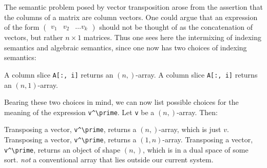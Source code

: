 The semantic problem posed by vector transposition arose from the assertion
that the columns of a matrix are column vectors. One could argue that an
expression of the form $\begin{pmatrix}v_1 & v_2 & \dots v_k \end{pmatrix}$
should not be thought of as the concatenation of vectors, but rather $n\times1$
matrices. Thus one sees here the intermixing of indexing semantics and
algebraic semantics, since one now has two choices of indexing semantics:

A column slice \lstinline|A[:, i]| returns an $(n,)$-array.\label{rule:col1}
A column slice \lstinline|A[:, i]| returns an $(n,1)$-array.\label{rule:col2}

Bearing these two choices in mind, we can now list possible choices for the
meaning of the expression \lstinline|v^\prime|. Let \lstinline|v| be a $(n,)$-array. Then:

Transposing a vector, \lstinline|v^\prime|, returns a $(n,)$-array, which is just
      $v$.\label{rule:v'1}
Transposing a vector, \lstinline|v^\prime|, returns a $(1,n)$-array.\label{rule:v'2}
Transposing a vector, \lstinline|v^\prime|, returns an object of shape $(n,)$,
      which is in a dual space of some sort. \textit{not} a conventional array
      that lies outside our current system.\label{rule:v'3}
%

